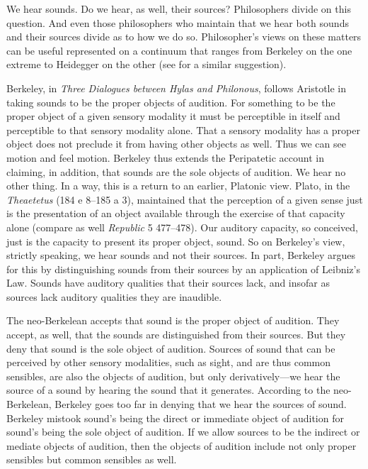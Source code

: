 We hear sounds. Do we hear, as well, their sources? Philosophers divide on this question. And even those philosophers who maintain that we hear both sounds and their sources divide as to how we do so. Philosopher's views on these matters can be useful represented on a continuum that ranges from Berkeley on the one extreme to Heidegger on the other (see \citealt{Leddington:2014aa} for a similar suggestion). 

\nocite{Berkeley:1734fk} Berkeley, in \emph{Three Dialogues between Hylas and Philonous}, follows Aristotle in taking sounds to be the proper objects of audition. For something to be the proper object of a given sensory modality it must be perceptible in itself and perceptible to that sensory modality alone. That a sensory modality has a proper object does not preclude it from having other objects as well. Thus we can see motion and feel motion. Berkeley thus extends the Peripatetic account in claiming, in addition, that sounds are the sole objects of audition. We hear no other thing. In a way, this is a return to an earlier, Platonic view. Plato, in the \emph{Theaetetus} (184 e 8--185 a 3), maintained that the perception of a given sense just is the presentation of an object available through the exercise of that capacity alone (compare as well \emph{Republic} 5 477--478). Our auditory capacity, so conceived, just is the capacity to present its proper object, sound. So on Berkeley's view, strictly speaking, we hear sounds and not their sources. In part, Berkeley argues for this by distinguishing sounds from their sources by an application of Leibniz's Law. Sounds have auditory qualities that their sources lack, and insofar as sources lack auditory qualities they are inaudible. 

The neo-Berkelean accepts that sound is the proper object of audition. They accept, as well, that the sounds are distinguished from their sources. But they deny that sound is the sole object of audition. Sources of sound that can be perceived by other sensory modalities, such as sight, and are thus common sensibles, are also the objects of audition, but only derivatively---we hear the source of a sound by hearing the sound that it generates. According to the neo-Berkelean, Berkeley goes too far in denying that we hear the sources of sound. Berkeley mistook sound's being the direct or immediate object of audition for sound's being the sole object of audition. If we allow sources to be the indirect or mediate objects of audition, then the objects of audition include not only proper sensibles but common sensibles as well.

